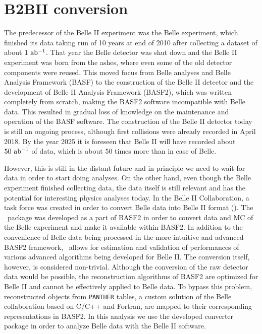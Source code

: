 \chapter{B2BII conversion}
The predecessor of the Belle II experiment was the Belle experiment, which finished its data taking run of 10 years at end of 2010 after collecting a dataset of about $1\mathrm{~ab^{-1}}$. That year the Belle detector was shut down and the Belle II experiment was born from the ashes, where even some of the old detector components were reused. This moved focus from Belle analyses and Belle Analysis Framework (BASF) to the construction of the Belle II detector and the development of Belle II Analysis Framework (BASF2), which was written completely from scratch, making the BASF2 software incompatible with Belle data. This resulted in gradual loss of knowledge on the maintenance and operation of the BASF software. The construction of the Belle II detector today is still an ongoing process, although first collisions were already recorded in April 2018. By the year 2025 it is foreseen that Belle II will have recorded about $50\mathrm{~ab^{-1}}$ of data, which is about $50$ times more than in case of Belle. 

However, this is still in the distant future and in principle we need to wait for data in order to start doing analyses. On the other hand, even though the Belle experiment finished collecting data, the data itself is still relevant and has the potential for interesting physics analyses today. In the Belle II Collaboration, a task force was created in order to convert Belle data into Belle II format (\btbii). The \btbii~package was developed as a part of BASF2 in order to convert data and MC of the Belle experiment and make it available within BASF2. In addition to the convenience of Belle data being processed in the more intuitive and advanced BASF2 framework, \btbii~allows for estimation and validation of performances of various advanced algorithms being developed for Belle II. The conversion itself, however, is considered non-trivial. Although the conversion of the raw detector data would be possible, the reconstruction algorithms of BASF2 are optimized for Belle II and cannot be effectively applied to Belle data. To bypass this problem, reconstructed objects from \texttt{PANTHER} tables, a custom solution of the Belle collaboration based on C/C++ and Fortran, are mapped to their corresponding representations in BASF2. In this analysis we use the developed converter package in order to analyze Belle data with the Belle II software.

